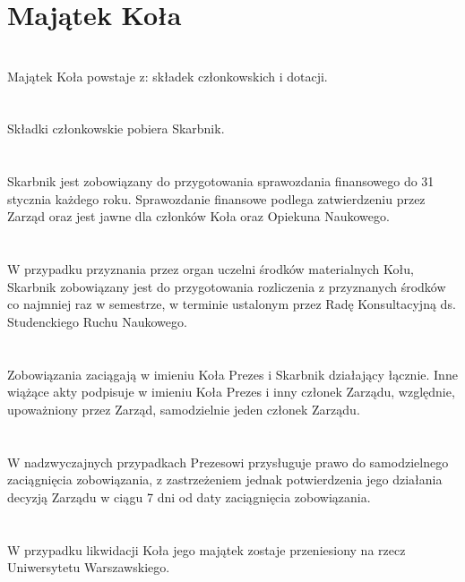 \section*{Majątek Koła~~~}
\section{}
Majątek Koła powstaje z: składek członkowskich i dotacji.
 
\section{}
Składki członkowskie pobiera Skarbnik.
 
\section{}
Skarbnik jest zobowiązany do przygotowania sprawozdania finansowego do 31 stycznia każdego roku. Sprawozdanie finansowe podlega zatwierdzeniu przez Zarząd oraz jest jawne dla członków Koła oraz Opiekuna Naukowego.

\section{}
W przypadku przyznania przez organ uczelni środków materialnych Kołu, Skarbnik zobowiązany jest do przygotowania rozliczenia z przyznanych środków co najmniej raz w semestrze, w terminie ustalonym przez Radę Konsultacyjną ds. Studenckiego Ruchu Naukowego.

\section{}
Zobowiązania zaciągają w imieniu Koła Prezes i Skarbnik działający łącznie. Inne wiążące akty podpisuje w imieniu Koła Prezes i inny członek Zarządu, względnie, upoważniony przez Zarząd, samodzielnie jeden członek Zarządu.
 
\section{}
W nadzwyczajnych przypadkach Prezesowi przysługuje prawo do samodzielnego zaciągnięcia zobowiązania, z zastrzeżeniem jednak potwierdzenia jego działania decyzją Zarządu w ciągu 7 dni od daty zaciągnięcia zobowiązania.
 
\section{}
W przypadku likwidacji Koła jego majątek zostaje przeniesiony na rzecz Uniwersytetu Warszawskiego.